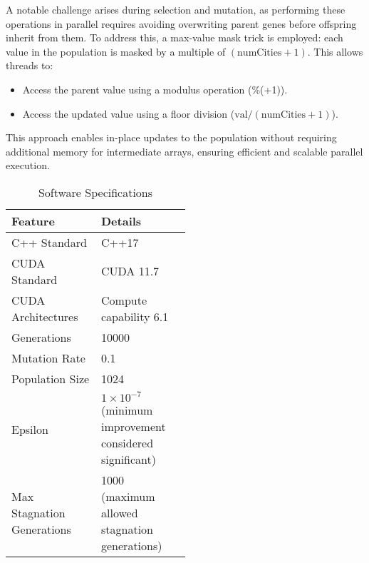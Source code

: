 \documentclass[conference]{IEEEtran}
\begin{document}
A notable challenge arises during selection and mutation, as performing these operations in parallel requires avoiding overwriting parent genes before offspring inherit from them. To address this, a max-value mask trick is employed: each value in the population is masked by a multiple of $(\text{numCities} + 1)$. This allows threads to:
\begin{itemize}
    \item Access the parent value using a modulus operation (\%(+1)).
    \item Access the updated value using a floor division ($\text{val}/(\text{numCities}+1) $).
\end{itemize}
This approach enables in-place updates to the population without requiring additional memory for intermediate arrays, ensuring efficient and scalable parallel execution.


\begin{table}[h!]
\centering
\caption{Software Specifications}
\begin{tabular}{|l|p{0.5\linewidth}|}
\hline
\textbf{Feature}          & \textbf{Details}                                                \\ \hline
C++ Standard              & C++17                                                           \\ \hline
CUDA Standard             & CUDA 11.7                                                      \\ \hline
CUDA Architectures        & Compute capability 6.1                                         \\ \hline
Generations               & 10000                                                          \\ \hline
Mutation Rate             & 0.1                                                            \\ \hline
Population Size           & 1024                                                           \\ \hline
Epsilon                   & $1 \times 10^{-7}$ (minimum improvement considered significant) \\ \hline
Max Stagnation Generations & 1000 (maximum allowed stagnation generations)                 \\ \hline
\end{tabular}
\label{tab:software_specs}
\end{table}
\end{document}
